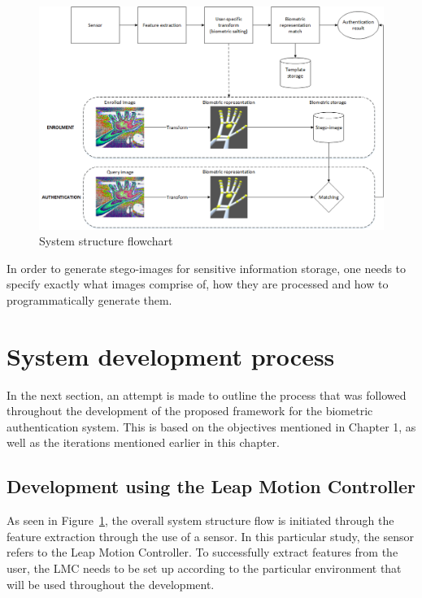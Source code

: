     
    \begin{figure}[htbp!] 
    \centering    
    \includegraphics[width=1.0\textwidth]{Chapter3/Figs/Figure3-4.png}
    \caption[System structure flowchart]{System structure flowchart}
    \label{fig:System structure flowchart}
    \end{figure}
    
In order to generate stego-images for sensitive information storage, one needs to specify exactly what images comprise of, how they are processed and how to programmatically generate them.

\section{System development process}

In the next section, an attempt is made to outline the process that was followed throughout the development of the proposed framework for the biometric authentication system. This is based on the objectives mentioned in Chapter 1, as well as the iterations mentioned earlier in this chapter.

\subsection{Development using the Leap Motion Controller}

As seen in Figure~\ref{fig:System structure flowchart}, the overall system structure flow is initiated through the feature extraction through the use of a sensor. In this particular study, the sensor refers to the Leap Motion Controller. To successfully extract features from the user, the LMC needs to be set up according to the particular environment that will be used throughout the development. 

